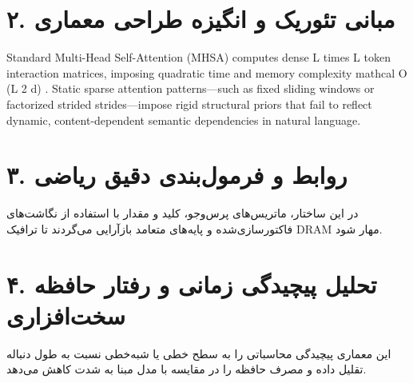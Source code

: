 \documentclass[12pt,a4paper]{article}
\begin{document}
\section*{۲. مبانی تئوریک و انگیزه طراحی معماری}
Standard Multi-Head Self-Attention (MHSA) computes dense L times L token interaction matrices, imposing quadratic time and memory complexity mathcal O (L 2 d) . Static sparse attention patterns—such as fixed sliding windows or factorized strided strides—impose rigid structural priors that fail to reflect dynamic, content-dependent semantic dependencies in natural language.

\section*{۳. روابط و فرمول‌بندی دقیق ریاضی}
در این ساختار، ماتریس‌های پرس‌وجو، کلید و مقدار با استفاده از نگاشت‌های فاکتورسازی‌شده و پایه‌های متعامد بازآرایی می‌گردند تا ترافیک DRAM مهار شود.

\section*{۴. تحلیل پیچیدگی زمانی و رفتار حافظه سخت‌افزاری}
این معماری پیچیدگی محاسباتی را به سطح خطی یا شبه‌خطی نسبت به طول دنباله تقلیل داده و مصرف حافظه را در مقایسه با مدل مبنا به شدت کاهش می‌دهد.
\end{document}
